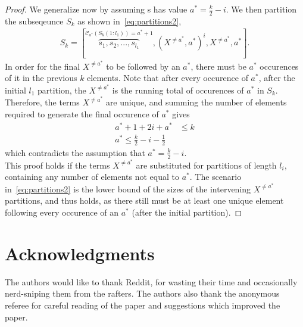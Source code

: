 \documentclass[12pt,reqno]{article}
\begin{document}
\begin{proof}
We generalize now by assuming s has value $a^* = \frac{k}{2}-i$. We then partition the subseqeunce $S_k$ as shown in~\eqref{eq:partitions2},
\begin{align}
S_k = [\overbrace{s_1,s_2,...,s_{l_1}}^{\mathcal{C}_{a^*}(S_k(1:l_1)) = a^*+1},(X^{\neq a^*},a^*)^{i},X^{\neq a^*},a^*].\label{eq:partitions2}
\end{align}
In order for the final $X^{\neq a^*}$ to be followed by an $a^*$, there must be $a^*$ occurences of it in the previous $k$ elements. Note that after every occurence of $a^*$, after the initial $l_1$ partition, the $X^{\neq a^*}$ is the running total of occurences of $a^*$ in $S_k$. Therefore, the terms $X^{\neq a^*}$ are unique, and summing the number of elements required to generate the final occurence of $a^*$ gives
\begin{align}
a^*+1+2i+a^* &\leq k\\
a^* \leq \frac{k}{2} - i - \frac{1}{2}
\end{align}
which contradicts the assumption that $a^* = \frac{k}{2}-i$.\\

This proof holds if the terms $X^{\neq a^*}$ are substituted for partitions of length $l_i$, containing any number of elements not equal to $a^*$. The scenario in~\eqref{eq:partitions2} is the lower bound of the sizes of the intervening $X^{\neq a^*}$ partitions, and thus holds, as there still must be at least one unique element following every occurence of an $a^*$ (after the initial partition). 
\end{proof}


\section{Acknowledgments}
The authors would like to thank Reddit, for wasting their time and occasionally nerd-sniping them from the rafters. The authors also thank the anonymous referee for careful reading of the paper and suggestions which improved the paper.
\end{document}
